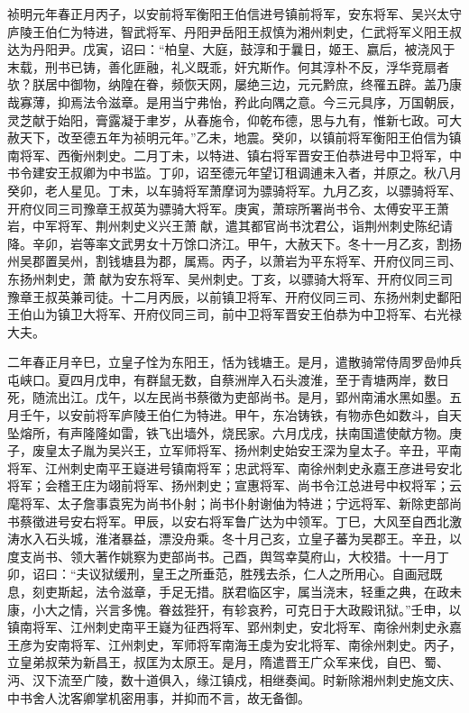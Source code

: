 \documentclass[]{article}
\begin{document}
祯明元年春正月丙子，以安前将军衡阳王伯信进号镇前将军，安东将军、吴兴太守庐陵王伯仁为特进，智武将军、丹阳尹岳阳王叔慎为湘州刺史，仁武将军义阳王叔达为丹阳尹。戊寅，诏曰：``柏皇、大庭，鼓淳和于曩日，姬王、嬴后，被浇风于末载，刑书已铸，善化匪融，礼义既乖，奸宄斯作。何其淳朴不反，浮华竞扇者欤？朕居中御物，纳隍在眷，频恢天网，屡绝三边，元元黔庶，终罹五辟。盖乃康哉寡薄，抑焉法令滋章。是用当宁弗怡，矜此向隅之意。今三元具序，万国朝辰，灵芝献于始阳，膏露凝于聿岁，从春施令，仰乾布德，思与九有，惟新七政。可大赦天下，改至德五年为祯明元年。''乙未，地震。癸卯，以镇前将军衡阳王伯信为镇南将军、西衡州刺史。二月丁未，以特进、镇右将军晋安王伯恭进号中卫将军，中书令建安王叔卿为中书监。丁卯，诏至德元年望订租调逋未入者，并原之。秋八月癸卯，老人星见。丁未，以车骑将军萧摩诃为骠骑将军。九月乙亥，以骠骑将军、开府仪同三司豫章王叔英为骠骑大将军。庚寅，萧琮所署尚书令、太傅安平王萧岩，中军将军、荆州刺史义兴王萧献，遣其都官尚书沈君公，诣荆州刺史陈纪请降。辛卯，岩等率文武男女十万馀口济江。甲午，大赦天下。冬十一月乙亥，割扬州吴郡置吴州，割钱塘县为郡，属焉。丙子，以萧岩为平东将军、开府仪同三司、东扬州刺史，萧献为安东将军、吴州刺史。丁亥，以骠骑大将军、开府仪同三司豫章王叔英兼司徒。十二月丙辰，以前镇卫将军、开府仪同三司、东扬州刺史鄱阳王伯山为镇卫大将军、开府仪同三司，前中卫将军晋安王伯恭为中卫将军、右光禄大夫。

二年春正月辛巳，立皇子恮为东阳王，恬为钱塘王。是月，遣散骑常侍周罗嵒帅兵屯峡口。夏四月戊申，有群鼠无数，自蔡洲岸入石头渡淮，至于青塘两岸，数日死，随流出江。戊午，以左民尚书蔡徵为吏部尚书。是月，郢州南浦水黑如墨。五月壬午，以安前将军庐陵王伯仁为特进。甲午，东冶铸铁，有物赤色如数斗，自天坠熔所，有声隆隆如雷，铁飞出墙外，烧民家。六月戊戌，扶南国遣使献方物。庚子，废皇太子胤为吴兴王，立军师将军、扬州刺史始安王深为皇太子。辛丑，平南将军、江州刺史南平王嶷进号镇南将军；忠武将军、南徐州刺史永嘉王彦进号安北将军；会稽王庄为翊前将军、扬州刺史；宣惠将军、尚书令江总进号中权将军；云麾将军、太子詹事袁宪为尚书仆射；尚书仆射谢伷为特进；宁远将军、新除吏部尚书蔡徵进号安右将军。甲辰，以安右将军鲁广达为中领军。丁巳，大风至自西北激涛水入石头城，淮渚暴益，漂没舟乘。冬十月己亥，立皇子蕃为吴郡王。辛丑，以度支尚书、领大著作姚察为吏部尚书。己酉，舆驾幸莫府山，大校猎。十一月丁卯，诏曰：``夫议狱缓刑，皇王之所垂范，胜残去杀，仁人之所用心。自画冠既息，刻吏斯起，法令滋章，手足无措。朕君临区宇，属当浇末，轻重之典，在政未康，小大之情，兴言多愧。眷兹狴犴，有轸哀矜，可克日于大政殿讯狱。''壬申，以镇南将军、江州刺史南平王嶷为征西将军、郢州刺史，安北将军、南徐州刺史永嘉王彦为安南将军、江州刺史，军师将军南海王虔为安北将军、南徐州刺史。丙子，立皇弟叔荣为新昌王，叔匡为太原王。是月，隋遣晋王广众军来伐，自巴、蜀、沔、汉下流至广陵，数十道俱入，缘江镇戍，相继奏闻。时新除湘州刺史施文庆、中书舍人沈客卿掌机密用事，并抑而不言，故无备御。
\end{document}
